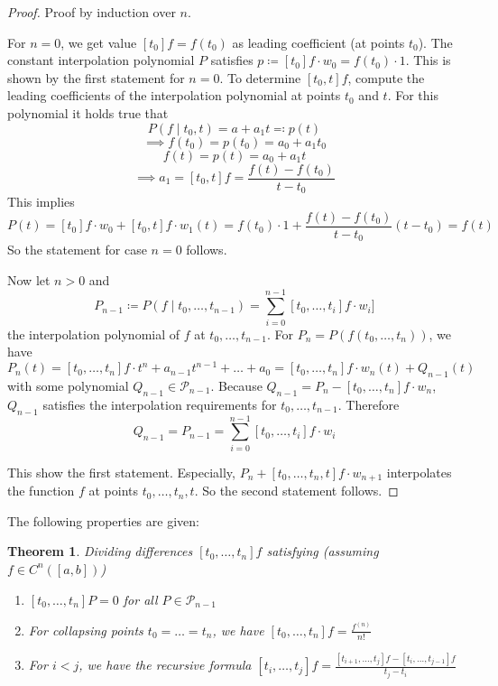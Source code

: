 \documentclass[a4paper]{article}
\newcounter{lecref}[section]
\numberwithin{lecref}{section}
\theoremstyle{break}
\newtheorem{thm}[lecref]{Theorem}
\begin{document}
\begin{proof}
  Proof by induction over $n$.

  For $n = 0$, we get value $[t_0] f = f(t_0)$ as leading coefficient (at points $t_0$).
  The constant interpolation polynomial $P$ satisfies $p \coloneqq [t_0] f \cdot w_0 = f(t_0) \cdot 1$.
  This is shown by the first statement for $n = 0$.
  To determine $[t_0, t] f$, compute the leading coefficients of the interpolation polynomial at points $t_0$ and $t$.
  For this polynomial it holds true that
  \[ P(f \mid t_0, t) = a + a_1 t \eqqcolon  p(t) \]
  \[ \implies f(t_0) = p(t_0) = a_0 + a_1 t_0 \]
  \[ f(t) = p(t) = a_0 + a_1 t \]
  \[ \implies a_1 = [t_0, t]f = \frac{f(t) - f(t_0)}{t - t_0} \]
  This implies
  \[ P(t) = [t_0] f \cdot w_0 + [t_0, t] f \cdot w_1(t) = f(t_0) \cdot 1 + \frac{f(t) - f(t_0)}{t - t_0} (t - t_0) = f(t) \]
  So the statement for case $n = 0$ follows.

  Now let $n > 0$ and 
  \[ P_{n-1} \coloneqq P(f \mid t_0, \dots, t_{n-1}) = \sum_{i=0}^{n-1} [t_0, \dots, t_i] f \cdot w_i] \]
  the interpolation polynomial of $f$ at $t_0, \dots, t_{n-1}$.
  For $P_n = P(f(t_0, \dots, t_n))$, we have
  \[ P_n(t) = [t_0, \dots, t_n] f \cdot t^n + a_{n-1} t^{n-1} + \dots + a_0 = [t_0, \dots, t_n] f \cdot w_n(t) + Q_{n-1}(t) \]
  with some polynomial $Q_{n-1} \in \mathcal P_{n-1}$. Because $Q_{n-1} = P_n - [t_0, \dots, t_n] f \cdot w_n$, $Q_{n-1}$ satisfies the interpolation requirements for $t_0, \dots, t_{n-1}$. Therefore
  \[ Q_{n-1} = P_{n-1} = \sum_{i=0}^{n-1} [t_0, \dots, t_i] f \cdot w_i \]

  This show the first statement.
  Especially, $P_n + [t_0, \dots, t_n, t] f \cdot w_{n+1}$ interpolates the function $f$ at points $t_0, \dots, t_n, t$.
  So the second statement follows.
\end{proof}

The following properties are given:

\begin{thm}
  \label{lemma:4-11}
  Dividing differences $[t_0, \dots, t_n] f$ satisfying (assuming $f \in C^n([a,b])$)
  \begin{enumerate}
    \item $[t_0, \dots, t_n] P = 0$ for all $P \in \mathcal P_{n-1}$
    \item For collapsing points $t_0 = \dots = t_n$, we have $[t_0, \dots, t_n] f = \frac{f^{(n)}}{n!}$
    \item For $i < j$, we have the recursive formula $[t_i, \dots, t_j] f = \frac{[t_{i+1}, \dots, t_j] f - [t_i, \dots, t_{j-1}] f}{t_j - t_i}$
  \end{enumerate}
\end{thm}
\end{document}

